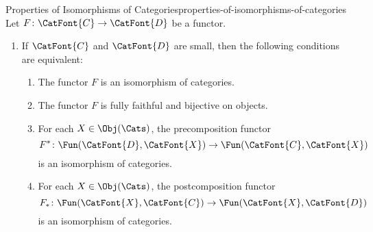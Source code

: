 \begin{proposition}{Properties of Isomorphisms of Categories}{properties-of-isomorphisms-of-categories}%
    Let $F\colon\CatFont{C}\to\CatFont{D}$ be a functor.
    \begin{enumerate}
        \item\label{properties-of-isomorphisms-of-categories-characterisations}If $\CatFont{C}$ and $\CatFont{D}$ are small, then the following conditions are equivalent:
            \begin{enumerate}
                \item\label{properties-of-isomorphisms-of-categories-characterisations-a}The functor $F$ is an isomorphism of categories.
                \item\label{properties-of-isomorphisms-of-categories-characterisations-b}The functor $F$ is fully faithful and bijective on objects.
                \item\label{properties-of-isomorphisms-of-categories-characterisations-c}For each $X\in\Obj(\Cats)$, the precomposition functor
                    \[
                        F^{*}%
                        \colon%
                        \Fun(\CatFont{D},\CatFont{X})%
                        \to%
                        \Fun(\CatFont{C},\CatFont{X})%
                    \]%
                    is an isomorphism of categories.
                \item\label{properties-of-isomorphisms-of-categories-characterisations-d}For each $X\in\Obj(\Cats)$, the postcomposition functor
                    \[
                        F_{*}%
                        \colon%
                        \Fun(\CatFont{X},\CatFont{C})%
                        \to%
                        \Fun(\CatFont{X},\CatFont{D})%
                    \]%
                    is an isomorphism of categories.
            \end{enumerate}
    \end{enumerate}
\end{proposition}
